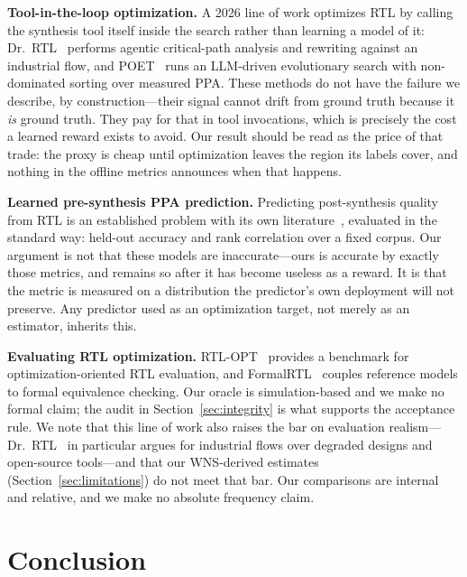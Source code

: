 \documentclass[journal]{IEEEtran}
\begin{document}
\textbf{Tool-in-the-loop optimization.} A 2026 line of work optimizes RTL by
calling the synthesis tool itself inside the search rather than learning a
model of it: Dr.\ RTL~\cite{drrtl2026} performs agentic critical-path analysis
and rewriting against an industrial flow, and POET~\cite{poet2026} runs an
LLM-driven evolutionary search with non-dominated sorting over measured PPA.
These methods do not have the failure we describe, by construction---their
signal cannot drift from ground truth because it \emph{is} ground truth. They
pay for that in tool invocations, which is precisely the cost a learned reward
exists to avoid. Our result should be read as the price of that trade: the
proxy is cheap until optimization leaves the region its labels cover, and
nothing in the offline metrics announces when that happens.

\textbf{Learned pre-synthesis PPA prediction.} Predicting post-synthesis
quality from RTL is an established problem with its own
literature~\cite{fang2024presynthesis,ustun2020accurate}, evaluated in the
standard way: held-out accuracy and rank correlation over a fixed corpus. Our
argument is not that these models are inaccurate---ours is accurate by exactly
those metrics, and remains so after it has become useless as a reward. It is
that the metric is measured on a distribution the predictor's own deployment
will not preserve. Any predictor used as an optimization target, not merely as
an estimator, inherits this.

\textbf{Evaluating RTL optimization.} RTL-OPT~\cite{lu2026rtlopt} provides a
benchmark for optimization-oriented RTL evaluation, and
FormalRTL~\cite{formalrtl2026} couples reference models to formal equivalence
checking. Our oracle is simulation-based and we make no formal claim; the audit
in Section~\ref{sec:integrity} is what supports the acceptance rule. We note
that this line of work also raises the bar on evaluation realism---Dr.\
RTL~\cite{drrtl2026} in particular argues for industrial flows over degraded
designs and open-source tools---and that our WNS-derived estimates
(Section~\ref{sec:limitations}) do not meet that bar. Our comparisons are
internal and relative, and we make no absolute frequency claim.

\section{Conclusion}
\end{document}
